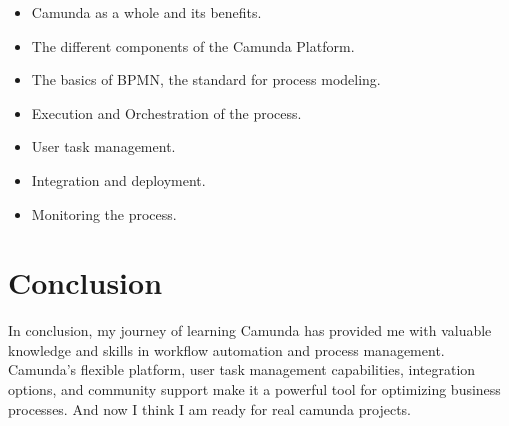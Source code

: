 \documentclass[12pt]{article}
\begin{document}
{  \begin{itemize}[noitemsep,nolistsep]
    \item Camunda as a whole and its benefits.
    \item The different components of the Camunda Platform.
    \item The basics of BPMN, the standard for process modeling.
    \item Execution and Orchestration of the process.
    \item User task management.
    \item Integration and deployment.
    \item Monitoring the process.
  \end{itemize}

  \section{Conclusion}

  In conclusion, my journey of learning Camunda has provided me with valuable knowledge and skills in workflow automation and process management. Camunda's flexible platform, user task management capabilities, integration options, and community support make it a powerful tool for optimizing business processes.
  And now I think I am ready for real camunda projects.

  }

  \printbibliography
\end{document}
